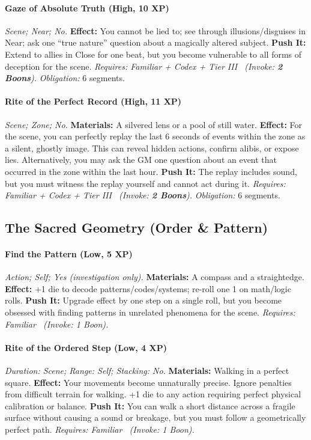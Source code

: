 \documentclass[12pt,twoside]{book}
\begin{document}
\paragraph{Gaze of Absolute Truth (High, 10 XP)} \emph{Scene; Near; No.}
\textbf{Effect:} You cannot be lied to; see through illusions/disguises in Near; ask one ``true nature'' question about a magically altered subject.
\textbf{Push It:} Extend to allies in Close for one beat, but you become vulnerable to all forms of deception for the scene.
\emph{Requires: Familiar + Codex + Tier III \ (\textit{Invoke:} \textbf{2 Boons}).}
\emph{Obligation:} 6 segments.

\paragraph{Rite of the Perfect Record (High, 11 XP)} \emph{Scene; Zone; No.}
\textbf{Materials:} A silvered lens or a pool of still water.
\textbf{Effect:} For the scene, you can perfectly replay the last 6 seconds of events within the zone as a silent, ghostly image. This can reveal hidden actions, confirm alibis, or expose lies. Alternatively, you may ask the GM one question about an event that occurred in the zone within the last hour.
\textbf{Push It:} The replay includes sound, but you must witness the replay yourself and cannot act during it.
\emph{Requires: Familiar + Codex + Tier III \ (\textit{Invoke:} \textbf{2 Boons}).}
\emph{Obligation:} 6 segments.

\subsection{The Sacred Geometry (Order \& Pattern)}
\paragraph{Find the Pattern (Low, 5 XP)} \emph{Action; Self; Yes (investigation only).}
\textbf{Materials:} A compass and a straightedge.
\textbf{Effect:} +1 die to decode patterns/codes/systems; re-roll one 1 on math/logic rolls.
\textbf{Push It:} Upgrade effect by one step on a single roll, but you become obsessed with finding patterns in unrelated phenomena for the scene.
\emph{Requires: Familiar \ (\textit{Invoke:} 1 Boon).}
\paragraph{Rite of the Ordered Step (Low, 4 XP)} \emph{Duration: Scene; Range: Self; Stacking: No.}
\textbf{Materials:} Walking in a perfect square.
\textbf{Effect:} Your movements become unnaturally precise. Ignore penalties from difficult terrain for walking. +1 die to any action requiring perfect physical calibration or balance.
\textbf{Push It:} You can walk a short distance across a fragile surface without causing a sound or breakage, but you must follow a geometrically perfect path.
\emph{Requires: Familiar \ (\textit{Invoke:} 1 Boon).}
\end{document}
